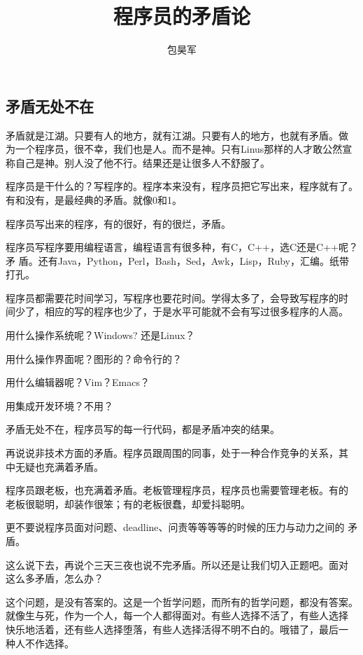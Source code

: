 \documentclass[10pt]{article}
\begin{document}
\begin{CJK*}{UTF8}{simsun}
\CJKtilde

\title{程序员的矛盾论}
\date{}
\author{包昊军}
\maketitle

\section{矛盾无处不在}

矛盾就是江湖。只要有人的地方，就有江湖。只要有人的地方，也就有矛盾。做
为一个程序员，很不幸，我们也是人。而不是神。只有Linus那样的人才敢公然宣
称自己是神。别人没了他不行。结果还是让很多人不舒服了。

程序员是干什么的？写程序的。程序本来没有，程序员把它写出来，程序就有了。
有和没有，是最经典的矛盾。就像0和1。

程序员写出来的程序，有的很好，有的很烂，矛盾。

程序员写程序要用编程语言，编程语言有很多种，有C，C++，选C还是C++呢？矛
盾。还有Java，Python，Perl，Bash，Sed，Awk，Lisp，Ruby，汇编。纸带打孔。

程序员都需要花时间学习，写程序也要花时间。学得太多了，会导致写程序的时
间少了，相应的写的程序也少了，于是水平可能就不会有写过很多程序的人高。

用什么操作系统呢？Windows? 还是Linux？

用什么操作界面呢？图形的？命令行的？

用什么编辑器呢？Vim？Emacs？

用集成开发环境？不用？

矛盾无处不在，程序员写的每一行代码，都是矛盾冲突的结果。

再说说非技术方面的矛盾。程序员跟周围的同事，处于一种合作竞争的关系，其
中无疑也充满着矛盾。

程序员跟老板，也充满着矛盾。老板管理程序员，程序员也需要管理老板。有的
老板很聪明，却装作很笨；有的老板很蠢，却爱抖聪明。

更不要说程序员面对问题、deadline、问责等等等等的时候的压力与动力之间的
矛盾。

这么说下去，再说个三天三夜也说不完矛盾。所以还是让我们切入正题吧。面对
这么多矛盾，怎么办？

这个问题，是没有答案的。这是一个哲学问题，而所有的哲学问题，都没有答案。
就像生与死，作为一个人，每一个人都得面对。有些人选择不活了，有些人选择
快乐地活着，还有些人选择堕落，有些人选择活得不明不白的。哦错了，最后一
种人不作选择。


\end{CJK*}
\end{document}
